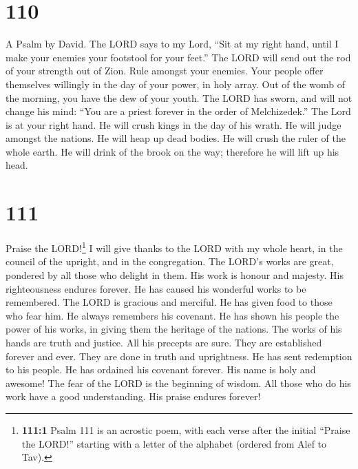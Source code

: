 \hypertarget{section-102}{%
\section{110}\label{section-102}}

A Psalm by David.  The LORD says to my Lord, ``Sit at my
right hand, until I make your enemies your footstool for your feet.''
 The LORD will send out the rod of your strength out of
Zion. Rule amongst your enemies.  Your people offer
themselves willingly in the day of your power, in holy array. Out of the
womb of the morning, you have the dew of your youth.  The
LORD has sworn, and will not change his mind: ``You are a priest forever
in the order of Melchizedek.''  The Lord is at your right
hand. He will crush kings in the day of his wrath.  He
will judge amongst the nations. He will heap up dead bodies. He will
crush the ruler of the whole earth.  He will drink of the
brook on the way; therefore he will lift up his head.

\hypertarget{section-103}{%
\section{111}\label{section-103}}

 Praise the LORD!\footnote{\textbf{111:1} Psalm 111 is an
  acrostic poem, with each verse after the initial ``Praise the LORD!''
  starting with a letter of the alphabet (ordered from Alef to Tav).} I
will give thanks to the LORD with my whole heart, in the council of the
upright, and in the congregation.  The LORD's works are
great, pondered by all those who delight in them.  His
work is honour and majesty. His righteousness endures forever.
 He has caused his wonderful works to be remembered. The
LORD is gracious and merciful.  He has given food to those
who fear him. He always remembers his covenant.  He has
shown his people the power of his works, in giving them the heritage of
the nations.  The works of his hands are truth and
justice. All his precepts are sure.  They are established
forever and ever. They are done in truth and uprightness. 
He has sent redemption to his people. He has ordained his covenant
forever. His name is holy and awesome!  The fear of the
LORD is the beginning of wisdom. All those who do his work have a good
understanding. His praise endures forever!

